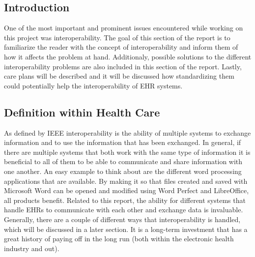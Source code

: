 \documentclass[14pt]{article}
\begin{document}
\subsection{Introduction} 
\label{sec:interopIntro}
One of the most important and prominent issues encountered while working on this project was interoperability. The goal of this section of the report is to familiarize the reader with the concept of interoperability and inform them of how it affects the problem at hand. Additionaly, possible solutions to the different interoperability problems are also included in this section of the report.  Lastly, care plans will be described and it will be discussed how standardizing them could potentially help the interoperability of \gls{EHR} systems.

\subsection{Definition within Health Care} 
\label{sec:interopDefinition}



As defined by \gls{IEEE} interoperability is the ability of multiple systems to exchange information and to use the information that has been exchanged.  In general, if there are multiple systems that both work with the same type of information it is beneficial to all of them to be able to communicate and share information with one another.  An easy example to think about are the different word processing applications that are available.  By making it so that files created and saved with Microsoft Word can be opened and modified using Word Perfect and LibreOffice, all products benefit.  Related to this report, the ability for different systems that handle \glspl{EHR} to communicate with each other and exchange data is invaluable.  Generally, there are a couple of different ways that interoperability is handled, which will be discussed in a later section.  It is a long-term investment that has a great history of paying off in the long run (both within the electronic health industry and out).
\end{document}
